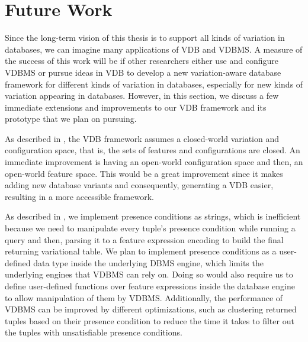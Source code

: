 \section{Future Work}
\label{sec:fw}

Since the long-term vision of this thesis is to support all kinds of variation
in databases, we can imagine many applications of VDB and VDBMS. A
measure of the success of this work will be if other researchers either use 
and configure VDBMS or pursue ideas in VDB to develop a new variation-aware
database framework  for different kinds of variation
in databases, especially for new kinds of variation appearing in databases. 
%
However, in this section, we discuss a few immediate extensions and
improvements to our VDB framework and its prototype that we plan on pursuing.

As described in , the VDB framework assumes a 
closed-world variation and configuration space, that is, the sets of features 
and configurations are closed. An immediate improvement is having an
open-world configuration space and then, an open-world feature space.
This would be a great improvement since it makes adding new database
variants and consequently, generating a VDB easier, resulting in a 
more accessible framework.

%
%
As described in , we implement presence conditions as strings, which is
inefficient because we need to manipulate every tuple's 
presence condition while running a 
query and then, parsing it to a feature expression encoding to build the final
returning variational table. We plan to implement presence conditions as a 
user-defined data type inside the underlying DBMS engine, which
limits the underlying engines that VDBMS can rely on. Doing so would also 
require us to
define user-defined functions over feature expressions inside the database engine
to allow manipulation of them by VDBMS. 
%
Additionally, the performance of VDBMS can be improved by different optimizations,
such as clustering returned tuples based on their presence condition to reduce the
time it takes to filter out the tuples with unsatisfiable presence conditions. 

